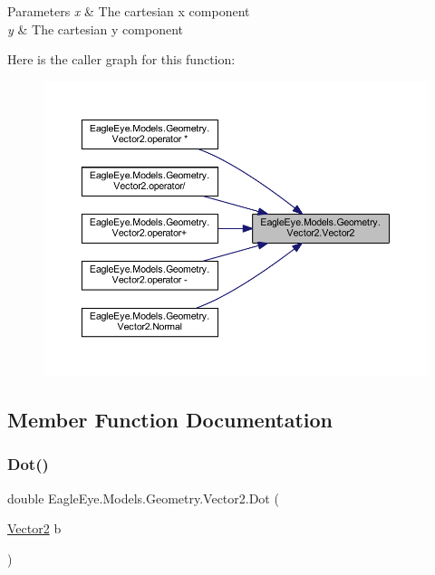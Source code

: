 \begin{DoxyParams}{Parameters}
{\em x} & The cartesian x component\\
\hline
{\em y} & The cartesian y component\\
\hline
\end{DoxyParams}
Here is the caller graph for this function\+:\nopagebreak
\begin{figure}[H]
\begin{center}
\leavevmode
\includegraphics[width=350pt]{struct_eagle_eye_1_1_models_1_1_geometry_1_1_vector2_ab45ce16ef5b5d8abf10b92a8ce38bea0_icgraph}
\end{center}
\end{figure}


\subsection{Member Function Documentation}
\mbox{\label{struct_eagle_eye_1_1_models_1_1_geometry_1_1_vector2_ac438b69be09b24284a433e741b70a559}} 
\subsubsection{\texorpdfstring{Dot()}{Dot()}}
{\footnotesize\ttfamily double Eagle\+Eye.\+Models.\+Geometry.\+Vector2.\+Dot (\begin{DoxyParamCaption}\item[{\mbox{\hyperlink{struct_eagle_eye_1_1_models_1_1_geometry_1_1_vector2}{Vector2}}}]{b }\end{DoxyParamCaption})}



